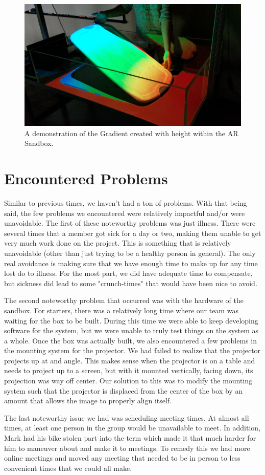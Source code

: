 \documentclass[onecolumn, draftclsnofoot,10pt, compsoc]{IEEEtran}
\begin{document}
\begin{figure}[H]
	\centering
	\includegraphics[width=1.\textwidth]{Sandbox_Gradient}
	\caption{A demonstration of the Gradient created with height within the AR Sandbox.}
	\label{fig:Sandbox_Gradient}
\end{figure}

\section{Encountered Problems} %
Similar to previous times, we haven't had a ton of problems.  
With that being said, the few problems we encountered were relatively impactful and/or were unavoidable.  
The first of these noteworthy problems was just illness.  There were several times that a member got sick for a day or two, making them unable to get very much work done on the project.
This is something that is relatively unavoidable (other than just trying to be a healthy person in general).
The only real avoidance is making sure that we have enough time to make up for any time lost do to illness.
For the most part, we did have adequate time to compensate, but sickness did lead to some "crunch-times" that would have been nice to avoid.
\par
The second noteworthy problem that occurred was with the hardware of the sandbox. 
For starters, there was a relatively long time where our team was waiting for the box to be built. 
During this time we were able to keep developing software for the system, but we were unable to truly test things on the system as a whole.
Once the box was actually built, we also encountered a few problems in the mounting system for the projector.
We had failed to realize that the projector projects up at and angle. 
This makes sense when the projector is on a table and needs to project up to a screen, but with it mounted vertically, facing down, its projection was way off center.
Our solution to this was to modify the mounting system such that the projector is displaced from the center of the box by an amount that allows the image to properly align itself.
\par
The last noteworthy issue we had was scheduling meeting times.
At almost all times, at least one person in the group would be unavailable to meet.
In addition, Mark had his bike stolen part into the term which made it that much harder for him to maneuver about and make it to meetings.
To remedy this we had more online meetings and moved any meeting that needed to be in person to less convenient times that we could all make.
\end{document}

